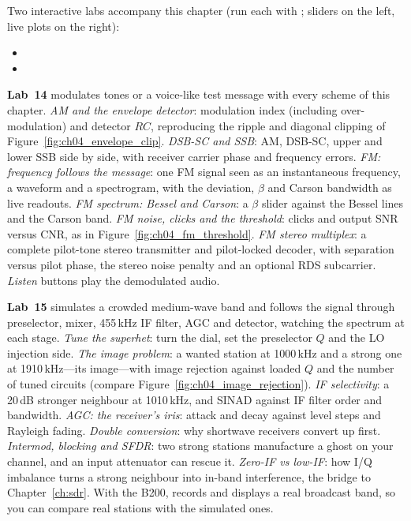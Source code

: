 \begin{labbox}
Two interactive labs accompany this chapter (run each with ; sliders on the left,
live plots on the right):
\begin{itemize}
\item {}
\item {}
\end{itemize}
\textbf{Lab~14} modulates tones or a voice-like test message with every scheme of this chapter. \emph{AM and
the envelope detector}: modulation index (including over-modulation) and detector $RC$, reproducing the ripple
and diagonal clipping of Figure~\ref{fig:ch04_envelope_clip}. \emph{DSB-SC and SSB}: AM, DSB-SC, upper and
lower SSB side by side, with receiver carrier phase and frequency errors. \emph{FM: frequency follows the
message}: one FM signal seen as an instantaneous frequency, a waveform and a spectrogram,
with the deviation, $\beta$ and Carson bandwidth as live readouts. \emph{FM spectrum: Bessel and Carson}: a $\beta$
slider against the Bessel lines and the Carson band. \emph{FM noise, clicks and the threshold}: clicks and
output SNR versus CNR, as in Figure~\ref{fig:ch04_fm_threshold}. \emph{FM stereo multiplex}: a complete
pilot-tone stereo transmitter and pilot-locked decoder, with separation versus pilot phase, the stereo noise
penalty and an optional RDS subcarrier. \emph{Listen} buttons play the demodulated audio.

\textbf{Lab~15} simulates a crowded medium-wave band and follows the signal through preselector, mixer,
455\,kHz IF filter, AGC and detector, watching the spectrum at each stage. \emph{Tune the superhet}: turn the
dial, set the preselector $Q$ and the LO injection side. \emph{The image problem}: a wanted station at
1000\,kHz and a strong one at 1910\,kHz---its image---with image rejection against loaded $Q$ and the number
of tuned circuits (compare Figure~\ref{fig:ch04_image_rejection}). \emph{IF selectivity}: a 20\,dB stronger
neighbour at 1010\,kHz, and SINAD against IF filter order and bandwidth. \emph{AGC: the receiver's iris}:
attack and decay against level steps and Rayleigh fading. \emph{Double conversion}: why shortwave receivers
convert up first. \emph{Intermod, blocking and SFDR}: two strong stations manufacture a ghost on your channel,
and an input attenuator can rescue it. \emph{Zero-IF vs low-IF}: how I/Q imbalance turns a strong neighbour
into in-band interference, the bridge to Chapter~\ref{ch:sdr}. With the B200,
 records and displays a real broadcast band, so you can compare
real stations with the simulated ones.
\end{labbox}

